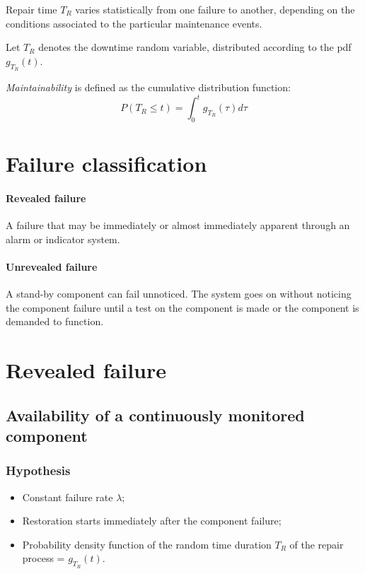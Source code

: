 Repair time $T_R$ varies statistically from one failure to another, depending on
the conditions associated to the particular maintenance events.

Let $T_R$ denotes the downtime random variable, distributed according to the pdf
$g_{T_R}(t)$.

\emph{Maintainability} is defined as the cumulative distribution function:
\begin{equation*}
    P(T_R \le t) = \int_0^t g_{T_R}(\tau)d\tau
\end{equation*}

\section{Failure classification}
\paragraph*{Revealed failure} A failure that may be immediately or almost
immediately apparent through an alarm or indicator system.

\paragraph*{Unrevealed failure} A stand-by component can fail unnoticed. The
system goes on without noticing the component failure until a test on the
component is made or the component is demanded to function.

\section{Revealed failure}
\subsection{Availability of a continuously monitored component}
\subsubsection*{Hypothesis}
\begin{itemize}
    \item Constant failure rate $\lambda$;
    \item Restoration starts immediately after the component failure;
    \item Probability density function of the random time duration $T_R$ of the
    repair process = $g_{T_R}(t)$.
\end{itemize}

